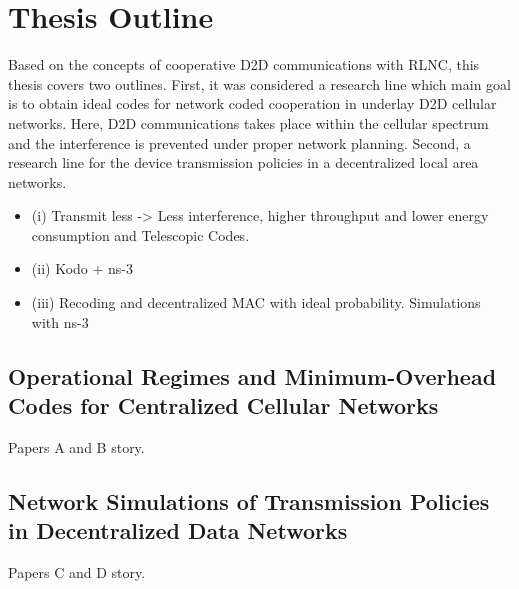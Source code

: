 \section{Thesis Outline}\label{sec:intro_thesis_outline}

Based on the concepts of cooperative \ac{D2D} communications with \ac{RLNC}, this thesis covers two outlines. First, it was considered a research line which main goal is to obtain ideal codes for network coded cooperation in underlay \ac{D2D} cellular networks. Here, \ac{D2D} communications takes place within the cellular spectrum and the interference is prevented under proper network planning. Second, a research line for the device transmission policies in a decentralized local area networks.

\begin{itemize}
\item  (i) Transmit less -> Less interference, higher throughput and lower energy consumption and Telescopic Codes.
\item (ii) Kodo + ns-3
\item (iii) Recoding and decentralized MAC with ideal probability. Simulations with ns-3
\end{itemize}

\subsection{Operational Regimes and Minimum-Overhead Codes for Centralized Cellular Networks}

Papers A and B story.

\subsection{Network Simulations of Transmission Policies in Decentralized Data Networks}

Papers C and D story.